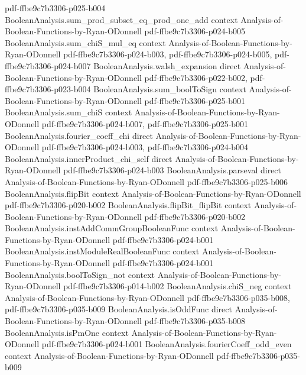 \begin{lemma}
  {pdf-ffbe9c7b3306-p025-b004}
\proofstep
  {BooleanAnalysis.sum_prod_subset_eq_prod_one_add}
  {context}
  {Analysis-of-Boolean-Functions-by-Ryan-ODonnell}
  {pdf-ffbe9c7b3306-p024-b005}
\proofstep
  {BooleanAnalysis.sum_chiS_mul_eq}
  {context}
  {Analysis-of-Boolean-Functions-by-Ryan-ODonnell}
  {pdf-ffbe9c7b3306-p024-b003,
    pdf-ffbe9c7b3306-p024-b005,
    pdf-ffbe9c7b3306-p024-b007}
\proofstep
  {BooleanAnalysis.walsh_expansion}
  {direct}
  {Analysis-of-Boolean-Functions-by-Ryan-ODonnell}
  {pdf-ffbe9c7b3306-p022-b002,
    pdf-ffbe9c7b3306-p023-b004}
\proofstep
  {BooleanAnalysis.sum_boolToSign}
  {context}
  {Analysis-of-Boolean-Functions-by-Ryan-ODonnell}
  {pdf-ffbe9c7b3306-p025-b001}
\proofstep
  {BooleanAnalysis.sum_chiS}
  {context}
  {Analysis-of-Boolean-Functions-by-Ryan-ODonnell}
  {pdf-ffbe9c7b3306-p024-b007,
    pdf-ffbe9c7b3306-p025-b001}
\proofstep
  {BooleanAnalysis.fourier_coeff_chi}
  {direct}
  {Analysis-of-Boolean-Functions-by-Ryan-ODonnell}
  {pdf-ffbe9c7b3306-p024-b003,
    pdf-ffbe9c7b3306-p024-b004}
\proofstep
  {BooleanAnalysis.innerProduct_chi_self}
  {direct}
  {Analysis-of-Boolean-Functions-by-Ryan-ODonnell}
  {pdf-ffbe9c7b3306-p024-b003}
\proofstep
  {BooleanAnalysis.parseval}
  {direct}
  {Analysis-of-Boolean-Functions-by-Ryan-ODonnell}
  {pdf-ffbe9c7b3306-p025-b006}
\proofstep
  {BooleanAnalysis.flipBit}
  {context}
  {Analysis-of-Boolean-Functions-by-Ryan-ODonnell}
  {pdf-ffbe9c7b3306-p020-b002}
\proofstep
  {BooleanAnalysis.flipBit_flipBit}
  {context}
  {Analysis-of-Boolean-Functions-by-Ryan-ODonnell}
  {pdf-ffbe9c7b3306-p020-b002}
\proofstep
  {BooleanAnalysis.instAddCommGroupBooleanFunc}
  {context}
  {Analysis-of-Boolean-Functions-by-Ryan-ODonnell}
  {pdf-ffbe9c7b3306-p024-b001}
\proofstep
  {BooleanAnalysis.instModuleRealBooleanFunc}
  {context}
  {Analysis-of-Boolean-Functions-by-Ryan-ODonnell}
  {pdf-ffbe9c7b3306-p024-b001}
\proofstep
  {BooleanAnalysis.boolToSign_not}
  {context}
  {Analysis-of-Boolean-Functions-by-Ryan-ODonnell}
  {pdf-ffbe9c7b3306-p014-b002}
\proofstep
  {BooleanAnalysis.chiS_neg}
  {context}
  {Analysis-of-Boolean-Functions-by-Ryan-ODonnell}
  {pdf-ffbe9c7b3306-p035-b008,
    pdf-ffbe9c7b3306-p035-b009}
\proofstep
  {BooleanAnalysis.isOddFunc}
  {direct}
  {Analysis-of-Boolean-Functions-by-Ryan-ODonnell}
  {pdf-ffbe9c7b3306-p035-b008}
\proofstep
  {BooleanAnalysis.isPmOne}
  {context}
  {Analysis-of-Boolean-Functions-by-Ryan-ODonnell}
  {pdf-ffbe9c7b3306-p024-b001}
\proofstep
  {BooleanAnalysis.fourierCoeff_odd_even}
  {context}
  {Analysis-of-Boolean-Functions-by-Ryan-ODonnell}
  {pdf-ffbe9c7b3306-p035-b009}

\end{lemma}
